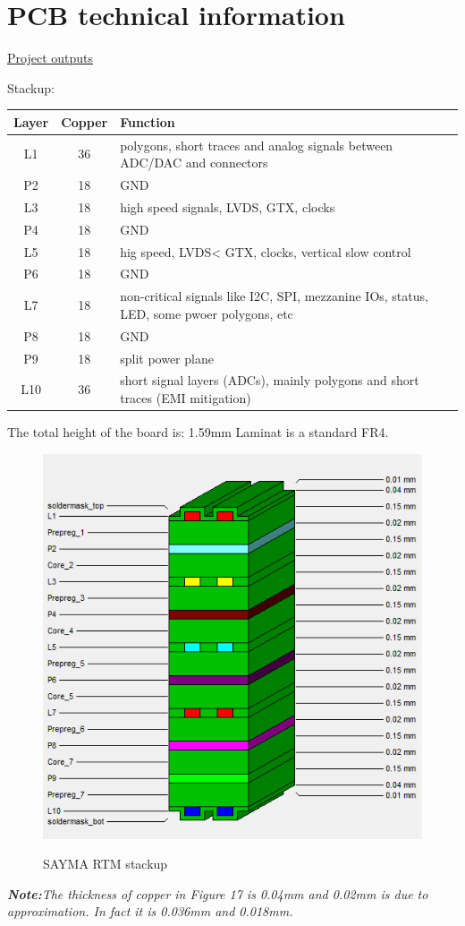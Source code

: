 \section{PCB technical information}

\href{https://github.com/m-labs/sinara/tree/master/ARTIQ_EE/PCB_Sayma_RTM/Output}{Project outputs}

Stackup:

\begin{longtable}{|c|c|l|}\hline
Layer& Copper&	Function \\ \hline
L1& 36 &	polygons, short traces and analog signals between ADC/DAC and connectors\\ \hline
P2&	18 &GND\\ \hline
L3&	18 &high speed signals, LVDS, GTX, clocks\\ \hline
P4&	18& GND\\ \hline
L5&	18&hig speed, LVDS< GTX, clocks, vertical slow control\\ \hline
P6&	18&GND\\ \hline
L7&	18&non-critical signals like I2C, SPI, mezzanine IOs, status, LED, some pwoer polygons, etc\\ \hline
P8&	18&GND\\ \hline
P9&	18&split power plane\\ \hline
L10&36&	short signal layers (ADCs), mainly polygons and short traces (EMI mitigation)\\ \hline
\end{longtable}
The total height of the board is: 1.59mm 
Laminat is a standard FR4.

	\begin{figure}[htbp!]
		\centering
		\includegraphics[width=12cm]{img/stackup.png}\\
		\caption{SAYMA RTM stackup}
	\end{figure}
	
\textit{\textbf{Note:}The thickness of copper in Figure 17 is 0.04mm and 0.02mm is due to approximation. In fact it is 0.036mm and 0.018mm.}	
